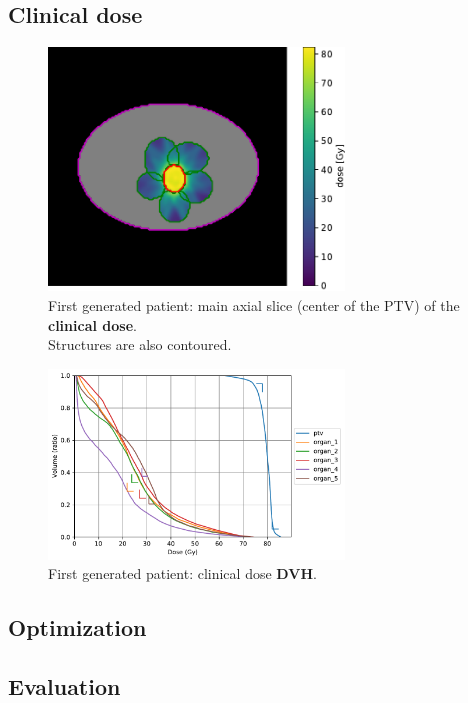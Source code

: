 \subsection*{Clinical dose}
\begin{figure}
	\centering
	\includegraphics[width=0.7\textwidth]{main_slice-dose.pdf}
	\caption{First generated patient: main axial slice (center of the PTV) of the \textbf{clinical dose}.\\
	Structures are also contoured.}
	\label{fig:main_slice-dose}
\end{figure}
\begin{figure}
	\centering
	\includegraphics[width=0.7\textwidth]{dvh_example.pdf}
	\caption{First generated patient: clinical dose \textbf{DVH}.}
	\label{fig:clinical_dvh}
\end{figure}

\subsection*{Optimization}

\subsection*{Evaluation}

